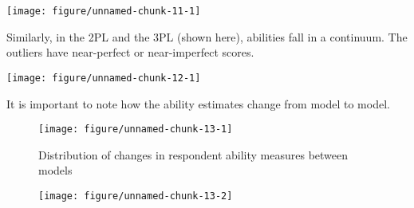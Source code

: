 \documentclass{article}\usepackage[]{graphicx}\usepackage[]{color}
\makeatletter
\newenvironment{kframe}{%
 \def\at@end@of@kframe{}%
 \ifinner\ifhmode%
  \def\at@end@of@kframe{\end{minipage}}%
  \begin{minipage}{\columnwidth}%
 \fi\fi%
 \def\FrameCommand##1{\hskip\@totalleftmargin \hskip-\fboxsep
 \colorbox{shadecolor}{##1}\hskip-\fboxsep
     \hskip-\linewidth \hskip-\@totalleftmargin \hskip\columnwidth}%
 \MakeFramed {\advance\hsize-\width
   \@totalleftmargin\z@ \linewidth\hsize
   \@setminipage}}%
 {\par\unskip\endMakeFramed%
 \at@end@of@kframe}
\newenvironment{knitrout}{}{} %
\makeatother
\begin{document}
\begin{enumerate}
\centering
\begin{knitrout}
\color{fgcolor}

{\centering \texttt{[image: figure/unnamed-chunk-11-1]} 

}



\end{knitrout}
\raggedright
Similarly, in the 2PL and the 3PL (shown here), abilities fall in a continuum. The outliers have near-perfect or near-imperfect scores.

\centering
\begin{knitrout}
\color{fgcolor}\begin{kframe}


{\ttfamily\noindent\itshape\color{messagecolor}{\#\# EM cycles terminated after 500 iterations.}}\end{kframe}

{\centering \texttt{[image: figure/unnamed-chunk-12-1]} 

}



\end{knitrout}
\raggedright
It is important to note how the ability estimates change from model to model.

\centering
\begin{knitrout}
\color{fgcolor}\begin{kframe}


{\ttfamily\noindent\itshape\color{messagecolor}{\#\# EM cycles terminated after 500 iterations.}}\end{kframe}\begin{figure}[H]

{\centering \texttt{[image: figure/unnamed-chunk-13-1]} 

}

\caption[Distribution of changes in respondent ability measures between models]{Distribution of changes in respondent ability measures between models}\label{fig:unnamed-chunk-131}
\end{figure}

\begin{figure}[H]

{\centering \texttt{[image: figure/unnamed-chunk-13-2]} 

}


\end{figure}
\end{knitrout}
\end{enumerate}
\end{document}
